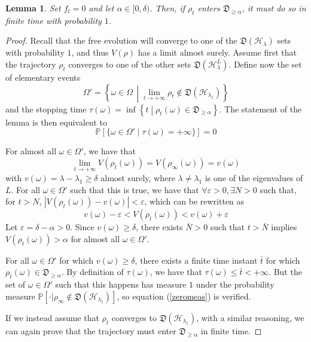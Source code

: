 \documentclass[conference]{IEEEtran}
\newcommand{\DHL}[1]{\mathfrak D(\mathcal H_{#1})}
\theoremstyle{plain}
\theoremstyle{plain}
\theoremstyle{plain}
\newtheorem{lem}[theorem]{Lemma}
\theoremstyle{plain}
\theoremstyle{remark}
\theoremstyle{definition}
\begin{document}
\begin{lem}
    Set $f_t= 0$ and let $\alpha \in [0, \delta)$. Then, if $\rho_t$ enters $\mathfrak D_{\ge \alpha}$, it must do so in finite time with probability $1$.
    \label{lemfiniteentrance3}
\end{lem}
\begin{proof}
    Recall that the free evolution will converge to one of the $\DHL{\lambda}$ sets with probability $1$, and thus $V(\rho)$ has a limit almost surely. Assume first that the trajectory $\rho_t$ converges to one of the other sets $\mathfrak D(\mathcal H^L_{\lambda})$. 
    Define now the set of elementary events \begin{equation}
        \Omega' = \left\{\omega \in \Omega \,\middle| \lim_{t \rightarrow +\infty} \rho_t \not \in \DHL{\lambda_1}\right\}
    \end{equation}
    and the stopping time \(
        \tau(\omega) = \inf\left\{t \middle| \rho_t(\omega) \in \mathfrak D_{\ge \alpha}\right\}.
    \)
    The statement of the lemma is then equivalent to \begin{equation}
        \mathbb P \left[\{\omega \in \Omega' \middle| \tau(\omega) = +\infty\}\right] = 0 \label{zeromeas}
    \end{equation}

    For almost all $\omega \in \Omega'$, we have that \begin{equation}
        \lim_{t \rightarrow +\infty} V(\rho_t(\omega)) = V\left(\rho_\infty(\omega)\right) = v(\omega)
    \end{equation}
    with $v(\omega) = \lambda - \lambda_1 \ge \delta$ almost surely, where $\lambda \neq \lambda_1$ is one of the eigenvalues of $L$. For all $\omega \in \Omega'$ such that this is true, we have that $\forall \varepsilon > 0, \exists N > 0$ such that, for $ t > N$, $|V(\rho_t(\omega)) - v(\omega)| < \varepsilon$, which can be rewritten as \begin{equation}
        v(\omega) - \varepsilon < V(\rho_t(\omega)) < v(\omega) + \varepsilon
    \end{equation}
    Let $\varepsilon = \delta - \alpha > 0$. Since $v(\omega) \ge \delta$, there exists $\bar N > 0$ such that $t > \bar N$ implies $V(\rho_t(\omega)) > \alpha$ for almost all $\omega \in \Omega'$.

    For all $\omega \in \Omega'$ for which $v(\omega) \ge \delta$, there exists a finite time instant $\bar t$ for which $\rho_{\bar t}(\omega) \in \mathfrak D_{\ge \alpha}$. By definition of $\tau(\omega)$, we have that $\tau(\omega) \le \bar t < +\infty$. But the set of $\omega \in \Omega'$ such that this happens has measure $1$ under the probability measure $\mathbb P[\cdot | \rho_\infty \not \in \DHL{\lambda_1}]$, so equation (\ref{zeromeas}) is verified.

    If we instead assume that $\rho_t$ converges to $\DHL{\lambda_1}$, with a similar reasoning, we can again prove that the trajectory must enter $\mathfrak D_{\ge \alpha}$ in finite time.
\end{proof}
\end{document}
